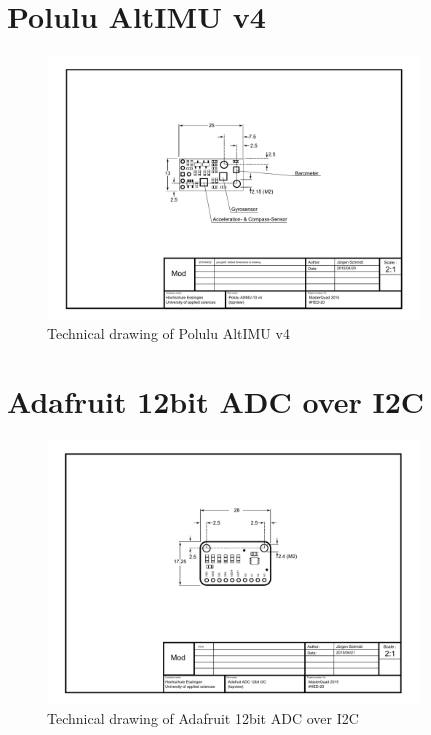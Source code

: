 \newpage
\section{Polulu AltIMU v4}
\label{sec:goals:altimu}
\begin{figure}[H]
    \centering
    \includegraphics[angle=90,width=0.88\textwidth]{fig/ch-zz-appendix/A-techDraw/A4_tech_draw_topview_imu}
    \caption{Technical drawing of Polulu AltIMU v4}
    \label{fig:parts:imu_topview}
\end{figure}

\section{Adafruit 12bit ADC over I2C}
\label{sec:goals:adc}
\begin{figure}[H]
    \centering
    \includegraphics[angle=90,width=0.88\textwidth]{fig/ch-zz-appendix/A-techDraw/A4_tech_draw_topview_adc}
    \caption{Technical drawing of Adafruit 12bit ADC over I2C}
    \label{fig:parts:adc_topview}
\end{figure}

